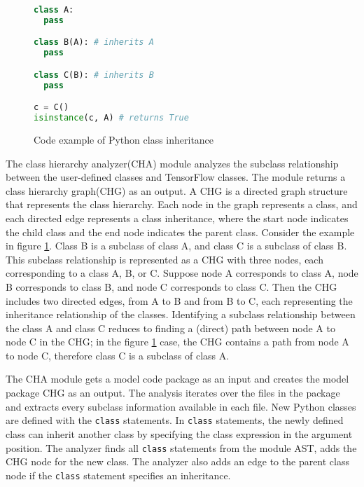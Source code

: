 \begin{figure}[h]
\begin{lstlisting}[language=Python]
class A:
  pass

class B(A): # inherits A
  pass

class C(B): # inherits B
  pass

c = C()
isinstance(c, A) # returns True
\end{lstlisting}
\caption{Code example of Python class inheritance}
\label{fig:cha:pythonex}
\end{figure}

The class hierarchy analyzer(CHA) module analyzes the
subclass relationship between the 
user-defined classes and TensorFlow classes.
The module returns a class hierarchy graph(CHG) as an output.
A CHG is a directed graph structure that represents the class hierarchy.
Each node in the graph represents a class,
and each directed edge represents a class inheritance,
where the start node indicates the child class
and the end node indicates the parent class.
Consider the example in figure \ref{fig:cha:pythonex}.
Class B is a subclass of class A, and class C is a subclass of 
class B.
This subclass relationship is represented as a CHG with three nodes,
each corresponding to a class A, B, or C.
Suppose node A corresponds to class A, node B corresponds to
class B, and node C corresponds to class C.
Then the CHG includes two directed edges, from A to B and from B to C,
each representing the inheritance relationship of the classes.
Identifying a subclass relationship between the class A and class C
reduces to finding a (direct) path between node A to node C in the CHG;
in the figure \ref{fig:cha:pythonex} case, the CHG contains a
path from node A to node C, therefore class C is a subclass
of class A.


The CHA module gets a model code package as an input
and creates the model package CHG as an output.
The analysis iterates over the files in the package
and extracts every subclass information available in each file.
New Python classes are defined with the {\tt class} statements.
In {\tt class} statements, the newly defined class can
inherit another class by specifying the class expression
in the argument position.
The analyzer finds all {\tt class} statements from the module AST,
adds the CHG node for the new class. The analyzer also adds an edge
to the parent class node if the {\tt class} statement specifies an inheritance.

